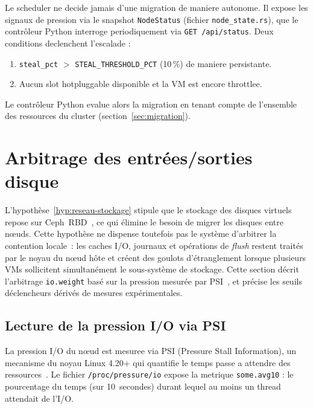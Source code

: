 Le scheduler ne decide jamais d'une migration de maniere autonome. Il expose les signaux de pression via le snapshot \texttt{NodeStatus} (fichier \texttt{node\_state.rs}), que le contrôleur Python interroge periodiquement via \texttt{GET /api/status}. Deux conditions declenchent l'escalade :

\begin{enumerate}
    \item \texttt{steal\_pct} $>$ \texttt{STEAL\_THRESHOLD\_PCT} (10\,\%) de maniere persistante.
    \item Aucun slot hotpluggable disponible et la VM est encore throttlee.
\end{enumerate}

Le contrôleur Python evalue alors la migration en tenant compte de l'ensemble des ressources du cluster (section~\ref{sec:migration}).

\section{Arbitrage des entrées/sorties disque}
\label{sec:disk-scheduler}

L'hypothèse~\ref{hyp:reseau-stockage} stipule que le stockage des disques virtuels repose sur Ceph~RBD~\cite{ceph_doc}, ce qui élimine le besoin de migrer les disques entre nœuds. Cette hypothèse ne dispense toutefois pas le système d'arbitrer la contention locale~: les caches I/O, journaux et opérations de \textit{flush} restent traités par le noyau du nœud hôte et créent des goulots d'étranglement lorsque plusieurs VMs sollicitent simultanément le sous-système de stockage. Cette section décrit l'arbitrage \texttt{io.weight} basé sur la pression mesurée par PSI~\cite{psi_doc}, et précise les seuils déclencheurs dérivés de mesures expérimentales.

\subsection{Lecture de la pression I/O via PSI}
\label{subsec:psi-io}

La pression I/O du nœud est mesuree via PSI (Pressure Stall Information), un mecanisme du noyau Linux 4.20+ qui quantifie le temps passe a attendre des ressources~\cite{psi_doc}. Le fichier \texttt{/proc/pressure/io} expose la metrique \texttt{some.avg10} : le pourcentage du temps (sur 10~secondes) durant lequel au moins un thread attendait de l'I/O.


